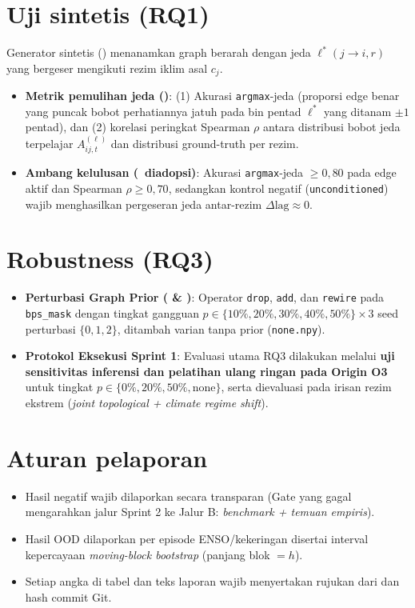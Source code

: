 \documentclass[11pt,a4paper]{article}
\begin{document}
\section{Uji sintetis (RQ1)}
Generator sintetis () menanamkan graph berarah dengan jeda $\ell^*(j \to i, r)$ yang bergeser mengikuti rezim iklim asal $c_j$.
\begin{itemize}
  \item \textbf{Metrik pemulihan jeda ()}: (1) Akurasi \texttt{argmax}-jeda (proporsi edge benar yang puncak bobot perhatiannya jatuh pada bin pentad $\ell^*$ yang ditanam $\pm 1$ pentad), dan (2) korelasi peringkat Spearman $\rho$ antara distribusi bobot jeda terpelajar $A^{(\ell)}_{ij,t}$ dan distribusi ground-truth per rezim.
  \item \textbf{Ambang kelulusan (\good\ diadopsi)}: Akurasi \texttt{argmax}-jeda $\ge 0{,}80$ pada edge aktif dan Spearman $\rho \ge 0{,}70$, sedangkan kontrol negatif (\texttt{unconditioned}) wajib menghasilkan pergeseran jeda antar-rezim $\Delta\text{lag} \approx 0$.
\end{itemize}

\section{Robustness (RQ3)}
\begin{itemize}
  \item \textbf{Perturbasi Graph Prior ( \& )}: Operator \texttt{drop}, \texttt{add}, dan \texttt{rewire} pada \texttt{bps\_mask} dengan tingkat gangguan $p \in \{10\%, 20\%, 30\%, 40\%, 50\%\} \times 3$ seed perturbasi $\{0, 1, 2\}$, ditambah varian tanpa prior (\texttt{none.npy}).
  \item \textbf{Protokol Eksekusi Sprint 1}: Evaluasi utama RQ3 dilakukan melalui \textbf{uji sensitivitas inferensi dan pelatihan ulang ringan pada Origin O3} untuk tingkat $p \in \{0\%, 20\%, 50\%, \text{none}\}$, serta dievaluasi pada irisan rezim ekstrem (\emph{joint topological + climate regime shift}).
\end{itemize}

\section{Aturan pelaporan}
\begin{itemize}
  \item Hasil negatif wajib dilaporkan secara transparan (Gate yang gagal mengarahkan jalur Sprint 2 ke Jalur B: \emph{benchmark + temuan empiris}).
  \item Hasil OOD dilaporkan per episode ENSO/kekeringan disertai interval kepercayaan \emph{moving-block bootstrap} (panjang blok $= h$).
  \item Setiap angka di tabel dan teks laporan wajib menyertakan rujukan  dari  dan hash commit Git.
\end{itemize}
\end{document}
